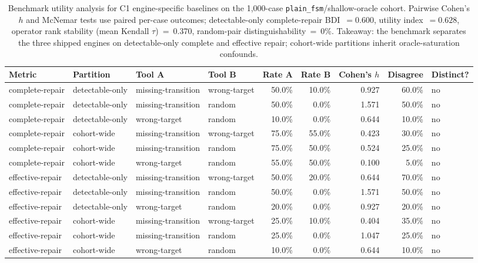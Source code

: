 \begin{table}[t]
\caption{Benchmark utility analysis for C1 engine-specific baselines on the 1{,}000-case \texttt{plain\_fsm}/shallow-oracle cohort. Pairwise Cohen's $h$ and McNemar tests use paired per-case outcomes; detectable-only complete-repair BDI~$=0.600$, utility index~$=0.628$, operator rank stability (mean Kendall $\tau$)~=~0.370, random-pair distinguishability~=~0\%. Takeaway: the benchmark separates the three shipped engines on detectable-only complete and effective repair; cohort-wide partitions inherit oracle-saturation confounds.}
\label{tab:benchmark-utility}
\begin{tabular}{@{}llllrrrrl@{}}
\toprule
Metric & Partition & Tool A & Tool B & Rate A & Rate B & Cohen's $h$ & Disagree & Distinct? \\
\midrule
complete-repair & detectable-only & missing-transition & wrong-target & 50.0\% & 10.0\% & 0.927 & 60.0\% & no \\
complete-repair & detectable-only & missing-transition & random & 50.0\% & 0.0\% & 1.571 & 50.0\% & no \\
complete-repair & detectable-only & wrong-target & random & 10.0\% & 0.0\% & 0.644 & 10.0\% & no \\
complete-repair & cohort-wide & missing-transition & wrong-target & 75.0\% & 55.0\% & 0.423 & 30.0\% & no \\
complete-repair & cohort-wide & missing-transition & random & 75.0\% & 50.0\% & 0.524 & 25.0\% & no \\
complete-repair & cohort-wide & wrong-target & random & 55.0\% & 50.0\% & 0.100 & 5.0\% & no \\
effective-repair & detectable-only & missing-transition & wrong-target & 50.0\% & 20.0\% & 0.644 & 70.0\% & no \\
effective-repair & detectable-only & missing-transition & random & 50.0\% & 0.0\% & 1.571 & 50.0\% & no \\
effective-repair & detectable-only & wrong-target & random & 20.0\% & 0.0\% & 0.927 & 20.0\% & no \\
effective-repair & cohort-wide & missing-transition & wrong-target & 25.0\% & 10.0\% & 0.404 & 35.0\% & no \\
effective-repair & cohort-wide & missing-transition & random & 25.0\% & 0.0\% & 1.047 & 25.0\% & no \\
effective-repair & cohort-wide & wrong-target & random & 10.0\% & 0.0\% & 0.644 & 10.0\% & no \\
\bottomrule
\end{tabular}
\end{table}
